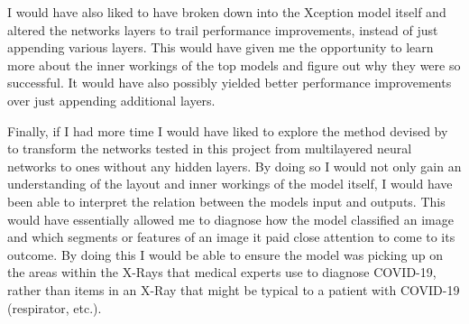 I would have also liked to have broken down into the Xception model itself and altered the networks layers to trail performance improvements, instead of just appending various layers. This would have given me the opportunity to learn more about the inner workings of the top models and figure out why they were so successful. It would have also possibly yielded better performance improvements over just appending additional layers.

Finally, if I had more time I would have liked to explore the method devised by \cite{kamimura2019neural} to transform the networks tested in this project from multilayered neural networks to ones without any hidden layers. By doing so I would not only gain an understanding of the layout and inner workings of the model itself, I would have been able to interpret the relation between the models input and outputs. This would have essentially allowed me to diagnose how the model classified an image and which segments or features of an image it paid close attention to come to its outcome. By doing this I would be able to ensure the model was picking up on the areas within the X-Rays that medical experts use to diagnose COVID-19, rather than items in an X-Ray that might be typical to a patient with COVID-19 (respirator, etc.).